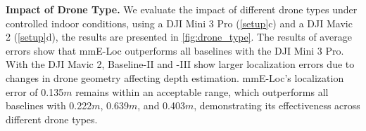 \textbf{Impact of Drone Type.} 
We evaluate the impact of different drone types under controlled indoor conditions, using a DJI Mini 3 Pro (\fig \ref{setup}c) and a DJI Mavic 2 (\fig \ref{setup}d), the results are presented in \fig \ref{fig:drone_type}. 
The results of average errors show that mmE-Loc outperforms all baselines with the DJI Mini 3 Pro.
With the DJI Mavic 2, Baseline-II and -III show larger localization errors due to changes in drone geometry affecting depth estimation. 
mmE-Loc's localization error of 0.135$m$ remains within an acceptable range, which outperforms all baselines with 0.222$m$, 0.639$m$, and 0.403$m$, demonstrating its effectiveness across different drone types.


